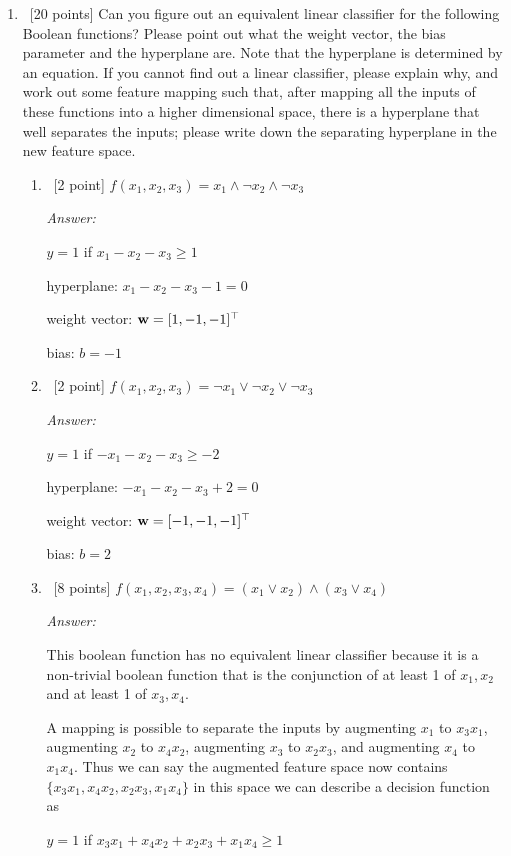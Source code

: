 \documentclass[12pt, fullpage,letterpaper]{article}
\begin{document}
\begin{enumerate}
\item~[20 points] Can you figure out an equivalent linear classifier for the following Boolean functions? Please point out what the weight vector, the bias parameter and the hyperplane are. Note that the hyperplane is determined by an equation. If you cannot find out a  linear classifier, please explain why, and work out some feature mapping such that, after mapping all the inputs of these functions into a higher dimensional space, there is a hyperplane that well separates the inputs; please write down the separating hyperplane in the new feature space. 
	\begin{enumerate}
		\item~[2 point] $f(x_1, x_2, x_3) = x_1 \land \neg x_2 \land \neg x_3$

		\textit{Answer:}

		$y = 1$ if $x_1 - x_2 - x_3 \ge 1$

		hyperplane: $x_1 - x_2 - x_3 - 1 = 0$

		weight vector: ${\bf w} = [1, -1, -1]^\top$

		bias: $b = -1$

		\item~[2 point] $f(x_1, x_2, x_3) = \neg x_1 \lor \neg x_2 \lor \neg x_3$ 

		\textit{Answer:}

		$y = 1$ if $-x_1 - x_2 - x_3 \ge -2$

		hyperplane: $-x_1 - x_2 - x_3 + 2 = 0$

		weight vector: ${\bf w} = [-1, -1, -1]^\top$

		bias: $b = 2$

		\item~[8 points] $f(x_1, x_2, x_3, x_4) = (x_1 \lor x_2) \land (x_3 \lor x_4)$

		\textit{Answer:}

		This boolean function has no equivalent linear classifier because it is a non-trivial boolean function that is the conjunction of at least 1 of ${x_1, x_2}$ and at least 1 of ${x_3, x_4}$.

		A mapping is possible to separate the inputs by augmenting $x_1$ to $x_3 x_1$, augmenting $x_2$ to $x_4 x_2$, augmenting $x_3$ to $x_2 x_3$, and augmenting $x_4$ to $x_1 x_4$.
		Thus we can say the augmented feature space now contains $\{x_3 x_1, x_4 x_2, x_2 x_3, x_1 x_4\}$ in this space we can describe a decision function as 

		$ y = 1$ if $x_3 x_1 + x_4 x_2 + x_2 x_3 + x_1 x_4 \ge 1$


\end{enumerate}
\end{enumerate}
\end{document}
